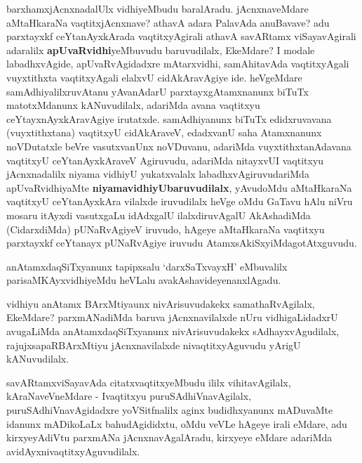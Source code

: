 \centerline{}

\begin{artha}
barxhamxjAcnxnadalUlx vidhiyeMbudu baralAradu. jAcnxnaveMdare aMtaHkaraNa
vaqtitxjAcnxnave? athavA adara PalavAda anuBavave? adu
parxtayxkf ceYtanAyxkArada vaqtitxyAgirali athavA savARtamx
viSayavAgirali adaralilx \textbf{apUvaRvidhi}yeMbuvudu baruvudilalx,
EkeMdare? I modale labadhxvAgide, apUvaRvAgidadxre mAtarxvidhi,
samAhitavAda vaqtitxyAgali vuyxtithxta vaqtitxyAgali elalxvU
cidAkAravAgiye ide. heVgeMdare samAdhiyalilxruvAtanu yAvanAdarU
parxtayxgAtamxnanunx biTuTx matotxMdanunx kANuvudilalx, adariMda avana
vaqtitxyu ceYtayxnAyxkAravAgiye irutatxde. samAdhiyanunx biTuTx
edidxruvavana (vuyxtithxtana) vaqtitxyU cidAkAraveV, edadxvanU saha
Atamxnanunx noVDutatxle beVre vasutxvanUnx noVDuvanu, adariMda
vuyxtithxtanAdavana vaqtitxyU ceYtanAyxkAraveV Agiruvudu, adariMda
nitayxvUI vaqtitxyu  jAcnxnadalilx niyama vidhiyU yukatxvalalx
labadhxvAgiruvudariMda apUvaRvidhiyaMte
\textbf{niyamavidhiyUbaruvudilalx}, yAvudoMdu aMtaHkaraNa vaqtitxyU
ceYtanAyxkAra vilalxde iruvudilalx heVge oMdu GaTavu hAlu niVru mosaru
itAyxdi vasutxgaLu idAdxgalU ilalxdiruvAgalU AkAshadiMda (CidarxdiMda)
pUNaRvAgiyeV iruvudo, hAgeye aMtaHkaraNa vaqtitxyu parxtayxkf
ceYtanayx pUNaRvAgiye iruvudu AtamxsAkiSxyiMdagotAtxguvudu.
\end{artha}

\centerline{}

\begin{artha}
anAtamxdaqSiTxyanunx tapipxsalu `darxSaTxvayxH' eMbuvalilx
parisaMKAyxvidhiyeMdu heVLalu avakAshavideyenanxlAgadu.

vidhiyu anAtamx BArxMtiyaunx nivArisuvudakekx samathaRvAgilalx,
EkeMdare? parxmANadiMda baruva jAcnxnavilalxde nUru vidhigaLidadxrU
avugaLiMda anAtamxdaqSiTxyanunx nivArisuvudakekx sAdhayxvAgudilalx,
rajujxsapaRBArxMtiyu jAcnxnavilalxde nivaqtitxyAguvudu yArigU kANuvudilalx.
\end{artha}

\begin{artha}
savARtamxviSayavAda citatxvaqtitxyeMbudu ililx vihitavAgilalx,
kAraNaveVneMdare - Ivaqtitxyu puruSAdhiVnavAgilalx,
puruSAdhiVnavAgidadxre yoVSitfnalilx aginx budidhxyanunx mADuvaMte
idanunx mADikoLaLx bahudAgididxtu, oMdu veVLe hAgeye irali eMdare,
adu kirxyeyAdiVtu parxmANa jAcnxnavAgalAradu, kirxyeye eMdare adariMda avidAyxnivaqtitxyAguvudilalx.
\end{artha}

